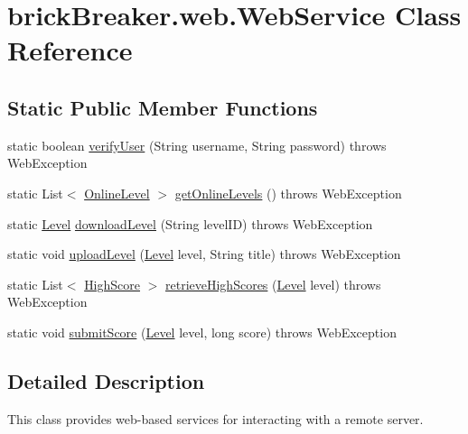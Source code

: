 \hypertarget{classbrick_breaker_1_1web_1_1_web_service}{
\section{brickBreaker.web.WebService Class Reference}
\label{classbrick_breaker_1_1web_1_1_web_service}
}
\subsection*{Static Public Member Functions}
\begin{DoxyCompactItemize}
\item 
static boolean \hyperlink{classbrick_breaker_1_1web_1_1_web_service_a8643c4061b5d45c94fb04bd7f8e7a6c1}{verifyUser} (String username, String password)  throws WebException 
\item 
static List$<$ \hyperlink{classbrick_breaker_1_1web_1_1_online_level}{OnlineLevel} $>$ \hyperlink{classbrick_breaker_1_1web_1_1_web_service_af93134d4498f18f2483593520017f069}{getOnlineLevels} ()  throws WebException 
\item 
static \hyperlink{classbrick_breaker_1_1_level}{Level} \hyperlink{classbrick_breaker_1_1web_1_1_web_service_a7b62956bb6e061279fc3e3223a2b0d60}{downloadLevel} (String levelID)  throws WebException 
\item 
static void \hyperlink{classbrick_breaker_1_1web_1_1_web_service_ae6a847822ec25d4383104f83896c528d}{uploadLevel} (\hyperlink{classbrick_breaker_1_1_level}{Level} level, String title)  throws WebException 
\item 
static List$<$ \hyperlink{classbrick_breaker_1_1web_1_1_high_score}{HighScore} $>$ \hyperlink{classbrick_breaker_1_1web_1_1_web_service_a4dd0376683c3179b7bb6ff169833e5e6}{retrieveHighScores} (\hyperlink{classbrick_breaker_1_1_level}{Level} level)  throws WebException 
\item 
static void \hyperlink{classbrick_breaker_1_1web_1_1_web_service_a518c7c9660da1e22973ec62effaf6c70}{submitScore} (\hyperlink{classbrick_breaker_1_1_level}{Level} level, long score)  throws WebException 
\end{DoxyCompactItemize}


\subsection{Detailed Description}
This class provides web-\/based services for interacting with a remote server.

